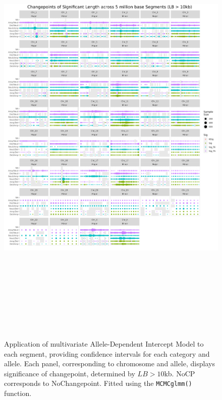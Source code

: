 \begin{figure}[!hp]
\centering
\includegraphics[width = 1\textwidth, height = 22cm]{../figures/Chapter_6/PerSegments_MCMC_10kb_fivemillion_Thesis.png}
\caption[Application of multivariate Allele-Dependent Intercept Model to each segment, providing confidence intervals for each category and allele. Significance determined by $LB > 10$kb.]{Application of multivariate Allele-Dependent Intercept Model to each segment, providing confidence intervals for each category and allele. Each panel, corresponding to chromosome and allele, displays significance of changepoint, determined by $LB > 10$kb. NoCP corresponds to NoChangepoint. Fitted using the \texttt{MCMCglmm()} function.}
\label{fig:PerSegment_MCMC}
\end{figure}
